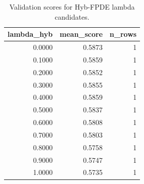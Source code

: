\begin{table}[t]
\caption{Validation scores for Hyb-FPDE lambda candidates.}
\label{tab:lambda_distribution_computed}
\centering
\begin{tabular}{rrr}
\toprule
lambda\_hyb & mean\_score & n\_rows \\
\midrule
0.0000 & 0.5873 & 1 \\
0.1000 & 0.5859 & 1 \\
0.2000 & 0.5852 & 1 \\
0.3000 & 0.5855 & 1 \\
0.4000 & 0.5859 & 1 \\
0.5000 & 0.5837 & 1 \\
0.6000 & 0.5808 & 1 \\
0.7000 & 0.5803 & 1 \\
0.8000 & 0.5758 & 1 \\
0.9000 & 0.5747 & 1 \\
1.0000 & 0.5735 & 1 \\
\bottomrule
\end{tabular}

\end{table}
